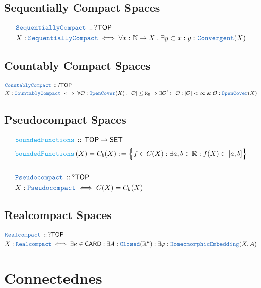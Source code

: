 \documentclass[12pt]{scrartcl}
\newcommand{\TYPE}[1]{\textcolor{NavyBlue}{\mathtt{#1}}}
\newcommand{\FUNC}[1]{\textcolor{Cerulean}{\mathtt{#1}}}
\renewcommand{\.}{\; . \;}
\newcommand{\de}{: \kern 0.1pc =}
\newcommand{\Act}[1]{\left( #1 \right)}
\newcommand{\DeclareType}[2]{& \TYPE{#1} \, :: \, #2 \\}
\newcommand{\DefineType}[3]{& #1 : \TYPE{#2} \iff #3 \\}
\newcommand{\DeclareFunc}[2]{& \FUNC{#1} \, :: \, #2 \\}
\newcommand{\DefineNamedFunc}[4]{&  \FUNC{#1}\Act{#2} = #3 \de #4 \\}
\newcommand{\Page}[1]{ \begin{align*} #1 \end{align*}   }
\renewcommand{\And}{\; \& \;}
\newcommand{\Imply}{\Rightarrow}
\newcommand{\Reals}{\mathbb{R} }
\newcommand{\Nat}{\mathbb{N} }
\newcommand{\SET}{\mathsf{SET}}
\newcommand{\TOP}{\mathsf{TOP}}
\begin{document}
\subsection{Sequentially Compact Spaces }
\Page{
	\DeclareType{SequentiallyCompact}{?\TOP}
	\DefineType{X}{SequentiallyCompact}{\forall x : \Nat \to X \. \exists y \subset x : y : \TYPE{Convergent}(X)}
}
\newpage
\subsection{Countably Compact Spaces}
\Page{
	\DeclareType{CountablyCompact}{?\TOP}
	\DefineType{X}{CountablyCompact}{\forall \mathcal{O} : \TYPE{OpenCover}(X) \. |\mathcal{O}| \le \aleph_0 \Imply \exists \mathcal{O}' \subset \mathcal{O} : |\mathcal{O}| < \infty \And \mathcal{O} : \TYPE{OpenCover}(X) }
}
\newpage
\subsection{Pseudocompact Spaces}
\Page{
	\DeclareFunc{boundedFunctions}{\TOP \to \SET}
	\DefineNamedFunc{boundedFunctions}{X}{C_b(X)}{\Big\{ f \in C(X) : \exists a,b \in \Reals : f(X) \subset [a,b] \Big\}}
	\\
	\DeclareType{Pseudocompact}{?\TOP}
	\DefineType{X}{Pseudocompact}{ C(X)  = C_b(X)}
}
\newpage
\subsection{Realcompact Spaces}
\Page{
	\DeclareType{Realcompact}{?\TOP}
	\DefineType{X}{Realcompact}{\exists \kappa \in \mathsf{CARD} : \exists A : \TYPE{Closed}(\Reals^\kappa) : \exists \varphi : \TYPE{HomeomorphicEmbedding}(X,A)}
}
\newpage
\section{Connectednes}
\end{document}
